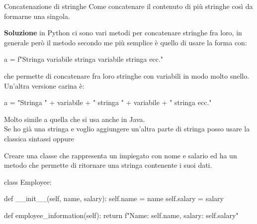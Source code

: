 \documentclass[10pt]{extarticle}
\makeatletter
\newcommand{\<}{\langle}
\renewcommand{\>}{\rangle}
\renewenvironment{proof}[1][\proofname] {\par\pushQED{\qed}
\renewcommand*{\proofname}{Soluzione}
{\normalfont\sffamily\bfseries\topsep6\p@\@plus6\p@\relax #1\@addpunct{.} }}{\popQED\endtrivlist\@endpefalse}
\theoremstyle{mystyle}{\newtheorem*{remark}{Nota}}
\theoremstyle{mystyle}{\newtheorem*{remarks}{Note}}
\theoremstyle{mystyle}{\newtheorem*{example}{Esempio}}
\theoremstyle{mystyle}{\newtheorem*{examples}{Esempi}}
\theoremstyle{definition}{\newtheorem*{exercise}{Exercise}}
\theoremstyle{warn}
\makeatother
\begin{document}
\begin{definition}{Concatenazione di stringhe}{}
Come concatenare il contenuto di più stringhe così da formarne una singola.
\end{definition}
\begin{proof}
in Python ci sono vari metodi per concatenare stringhe fra loro, in generale però il metodo secondo me più semplice è quello di usare la forma con:
\begin{python}
a = f"Stringa {variabile} stringa {variabile} stringa ecc."
\end{python}
che permette di concatenare fra loro stringhe con variabili in modo molto snello.\\
Un'altra versione carina è:
\begin{python}
a = "Stringa " + variabile + " stringa " + variabile + " stringa ecc."
\end{python}
Molto simile a quella che si usa anche in Java.\\
Se ho già una stringa e voglio aggiungere un'altra parte di stringa posso usare la classica sintassi  oppure 
\end{proof}
\begin{example}
Creare una classe che rappresenta un impiegato con nome e salario ed ha un metodo che permette di ritornare una stringa contenente i suoi dati.
\begin{python}
class Employee:
    
    def __init__(self, name, salary):
        self.name = name
        self.salary = salary
    
    def employee_information(self):
        return f"Name: {self.name}, salary: {self.salary}"
\end{python}
\end{example}
\end{document}
